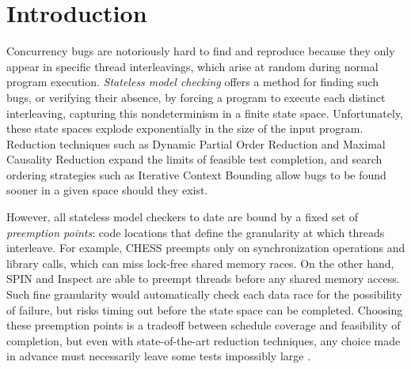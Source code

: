 \section{Introduction}

Concurrency bugs are notoriously hard to find and reproduce because they only appear in specific thread interleavings, which arise at random during normal program execution.
{\em Stateless model checking} \cite{verisoft} offers a method for finding such bugs,
or verifying their absence,
by forcing a program to execute each distinct interleaving,
capturing
this nondeterminism in a finite state space.
Unfortunately, these state spaces explode exponentially in the size of the input program.
Reduction techniques such as Dynamic Partial Order Reduction \cite{dpor} and Maximal Causality Reduction \cite{mcr} expand the limits of feasible test completion,
and search ordering strategies such as Iterative Context Bounding \cite{chess-icb} allow bugs to be found sooner in a given space should they exist.

However, all stateless model checkers to date are bound by a fixed set of {\em preemption points}: code locations that define the granularity at which threads interleave.
For example, \textsc{CHESS} \cite{chess} preempts only on synchronization operations and library calls, which can miss lock-free shared memory races.
%
On the other hand, SPIN \cite{spin} and Inspect \cite{inspect}
are able to preempt threads before any shared memory access. Such fine granularity would automatically check each data race for the possibility of failure, but risks timing out before the state space can be completed. %
Choosing these preemption points is a tradeoff between schedule coverage and feasibility of completion,
but even with state-of-the-art reduction techniques,
any choice made in advance must necessarily leave some tests impossibly large \cite{parrot,mcr}.
%

